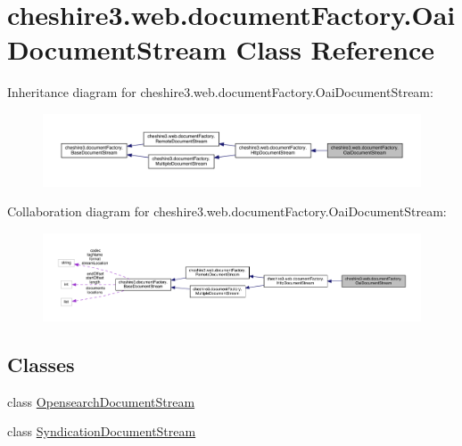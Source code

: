 \hypertarget{classcheshire3_1_1web_1_1document_factory_1_1_oai_document_stream}{\section{cheshire3.\-web.\-document\-Factory.\-Oai\-Document\-Stream Class Reference}
\label{classcheshire3_1_1web_1_1document_factory_1_1_oai_document_stream}
}


Inheritance diagram for cheshire3.\-web.\-document\-Factory.\-Oai\-Document\-Stream\-:
\nopagebreak
\begin{figure}[H]
\begin{center}
\leavevmode
\includegraphics[width=350pt]{classcheshire3_1_1web_1_1document_factory_1_1_oai_document_stream__inherit__graph}
\end{center}
\end{figure}


Collaboration diagram for cheshire3.\-web.\-document\-Factory.\-Oai\-Document\-Stream\-:
\nopagebreak
\begin{figure}[H]
\begin{center}
\leavevmode
\includegraphics[width=350pt]{classcheshire3_1_1web_1_1document_factory_1_1_oai_document_stream__coll__graph}
\end{center}
\end{figure}
\subsection*{Classes}
\begin{DoxyCompactItemize}
\item 
class \hyperlink{classcheshire3_1_1web_1_1document_factory_1_1_oai_document_stream_1_1_opensearch_document_stream}{Opensearch\-Document\-Stream}
\item 
class \hyperlink{classcheshire3_1_1web_1_1document_factory_1_1_oai_document_stream_1_1_syndication_document_stream}{Syndication\-Document\-Stream}
\end{DoxyCompactItemize}
